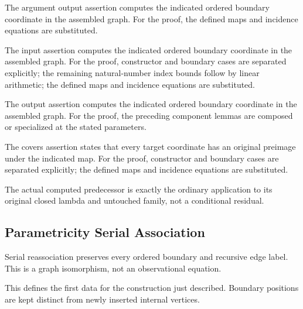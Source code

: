 The argument output assertion computes the indicated ordered boundary coordinate in the assembled graph.
For the proof, the defined maps and incidence equations are substituted.
\par{}

The input assertion computes the indicated ordered boundary coordinate in the assembled graph.
For the proof, constructor and boundary cases are separated explicitly; the remaining natural-number index bounds follow by linear arithmetic; the defined maps and incidence equations are substituted.
\par{}

The output assertion computes the indicated ordered boundary coordinate in the assembled graph.
For the proof, the preceding component lemmas are composed or specialized at the stated parameters.
\par{}

The covers assertion states that every target coordinate has an original preimage under the indicated map.
For the proof, constructor and boundary cases are separated explicitly; the defined maps and incidence equations are substituted.
\par{}

The actual computed predecessor is exactly the ordinary application to its original closed lambda and untouched family, not a conditional residual.
\par{}

\subsection{Parametricity Serial Association}
Serial reassociation preserves every ordered boundary and recursive edge label. This is a graph isomorphism, not an observational equation.

This defines the first data for the construction just described. Boundary positions are kept distinct from newly inserted internal vertices.
\par{}

